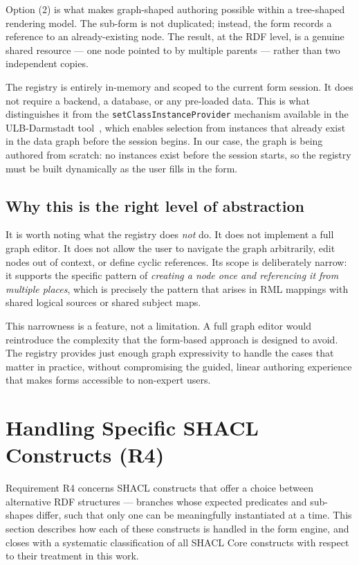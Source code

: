 Option (2) is what makes graph-shaped authoring possible within a tree-shaped rendering model.
The sub-form is not duplicated; instead, the form records a reference to an already-existing node.
The result, at the RDF level, is a genuine shared resource --- one node pointed to by multiple parents --- rather than two independent copies.

The registry is entirely in-memory and scoped to the current form session.
It does not require a backend, a database, or any pre-loaded data.
This is what distinguishes it from the \texttt{setClassInstanceProvider}
mechanism available in the ULB-Darmstadt tool~\cite{ulb-darmstadt-shacl-form}, which enables selection from instances that already exist in the data graph before the session begins.
In our case, the graph is being authored from scratch: no instances exist before the session starts, so the registry must be built dynamically as the user fills in the form.

\subsection{Why this is the right level of abstraction}

It is worth noting what the registry does \emph{not} do.
It does not implement a full graph editor.
It does not allow the user to navigate the graph arbitrarily, edit nodes out of context, or define cyclic references.
Its scope is deliberately narrow: it supports the specific pattern of \emph{creating a node once and referencing it from multiple places}, which is precisely the pattern that arises in RML mappings with shared logical sources or shared subject maps.

This narrowness is a feature, not a limitation.
A full graph editor would reintroduce the complexity that the form-based approach is designed to avoid.
The registry provides just enough graph expressivity to handle the cases that matter in practice, without compromising the guided, linear authoring experience that makes forms accessible to non-expert users.

\section{Handling Specific SHACL Constructs (R4)}
\label{sec:alternatives}

Requirement R4 concerns SHACL constructs that offer a choice between alternative RDF structures — branches whose expected predicates and sub-shapes differ, such that only one can be meaningfully instantiated at a time.
This section describes how each of these constructs is handled in the form engine, and closes with a systematic classification of all SHACL Core constructs with respect to their treatment in this work.

